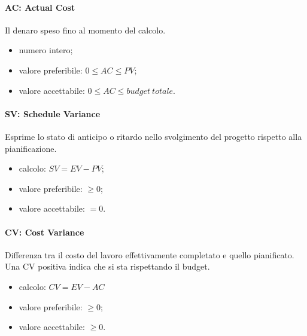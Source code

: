 		\paragraph{AC: Actual Cost}
		Il denaro speso fino al momento del calcolo.
		\begin{itemize}
		\item numero intero;
		\item valore preferibile: $0 \leq AC \le PV$;
		\item valore accettabile: $0 \leq AC \leq budget \ totale$.
		\end{itemize}
		
		\paragraph{SV: Schedule Variance}
		Esprime lo stato di anticipo o ritardo nello svolgimento del progetto rispetto alla pianificazione.
		\begin{itemize}
		\item calcolo: $SV = EV - PV$;
		\item valore preferibile: $\ge 0$;
		\item valore accettabile: $= 0$.
		\end{itemize}
		
		\paragraph{CV: Cost Variance}
		Differenza tra il costo del lavoro effettivamente completato e quello pianificato. Una CV positiva indica che si sta rispettando il budget.
		\begin{itemize}
		\item calcolo: $CV = EV - AC$
		\item valore preferibile: $\ge 0$;
		\item valore accettabile: $\geq 0$.
		\end{itemize}
		
